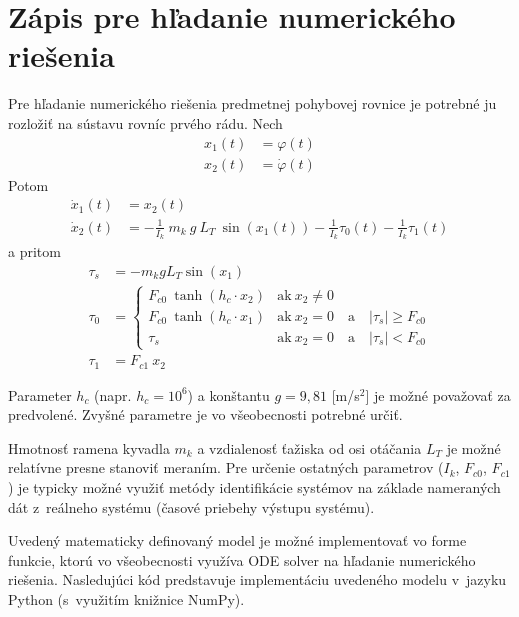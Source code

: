 \documentclass[a4paper, 10pt, ]{article}
\begin{document}
\section{Zápis pre hľadanie numerického riešenia}

Pre hľadanie numerického riešenia predmetnej pohybovej rovnice je potrebné ju rozložiť na sústavu rovníc prvého rádu. Nech
\begin{subequations}
\begin{align}
    x_1(t) &= \varphi(t) \\
    x_2(t) &= \dot \varphi(t)
\end{align}
\end{subequations}
Potom
\begin{subequations}
\begin{align}
    \dot x_1(t) &= x_2(t) \\
    \dot x_2(t) &= - \frac{1}{I_k}\ m_k \  g \   L_T\  \sin(x_1(t)) - \frac{1}{I_k} \tau_0(t) - \frac{1}{I_k} \tau_1(t)
\end{align}
\end{subequations}
a pritom
\begin{subequations}
\begin{align}
    \tau_s &= - m_k g L_T \sin(x_1) \\
    \tau_0 &= 
    \begin{cases} 
        F_{c0} \ \tanh(h_c\cdot x_2) & \text{ak}   \ x_2 \neq 0  \\
        F_{c0} \ \tanh(h_c\cdot      x_1) & \text{ak}   \ x_2 = 0 \quad \text{a} \quad \left|\tau_s\right| \geq F_{c0} \\
        \tau_s &  \text{ak}  \ x_2 = 0 \quad \text{a} \quad \left|\tau_s\right| < F_{c0}
    \end{cases}  \\
    \tau_1 &= F_{c1} \ x_2
\end{align}
\end{subequations}

Parameter $h_c$ (napr. $h_c = 10^6$) a konštantu $g = 9,81$ [m/s\(^2\)] je možné považovať za predvolené. Zvyšné parametre je vo všeobecnosti potrebné určiť.

Hmotnosť ramena kyvadla $m_k$ a vzdialenosť ťažiska od osi otáčania $L_T$ je možné relatívne presne stanoviť meraním. Pre určenie ostatných parametrov ($I_k$, $F_{c0}$, $F_{c1}$) je typicky možné využiť metódy identifikácie systémov na základe nameraných dát z~reálneho systému (časové priebehy výstupu systému).

Uvedený matematicky definovaný model je možné implementovať vo forme funkcie, ktorú vo všeobecnosti využíva ODE solver na hľadanie numerického riešenia. Nasledujúci kód predstavuje implementáciu uvedeného modelu v~jazyku Python (s~využitím knižnice NumPy). 
\end{document}
